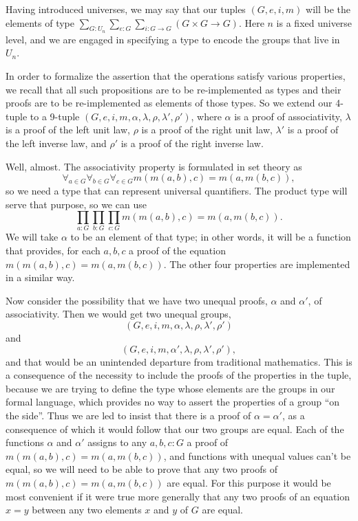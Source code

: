 \documentclass[letter,12pt]{amsart}
\theoremstyle{definition}
\theoremstyle{remark}
\numberwithin{equation}{section}
\begin{document}
Having introduced universes, we may say that our tuples $(G,e,i,m)$ will be the elements of type $\sum _ {G : U_n} \sum _ {e:G} \sum _ {i:G
  \to G} ( G \times G \to G )$.  Here $n$ is a fixed universe level, and we are engaged in specifying a type to encode the groups that live in
$U_n$.

In order to formalize the assertion that the operations satisfy various properties, we recall that all such propositions are to be
re-implemented as types and their proofs are to be re-implemented as elements of those types.  So we extend our 4-tuple to a 9-tuple
$(G,e,i,m,\alpha,\lambda,\rho,\lambda',\rho')$, where $\alpha$ is a proof of associativity, $\lambda$ is a proof of the left unit law, $\rho$ is
a proof of the right unit law, $\lambda'$ is a proof of the left inverse law, and $\rho'$ is a proof of the right inverse law.

Well, almost.  The associativity property is formulated in set theory as
$$\forall _ {a \in G}\forall _ {b \in G}\forall _ {c \in G} m (m (a,b), c) = m(a, m(b,c)),$$ so we need a type that can represent universal quantifiers.
The product type will serve that purpose, so we can use
 $$\prod _ {a: G}\prod _ {b: G}\prod _ {c: G} m (m (a,b), c) = m(a, m(b,c)).$$ We will take $\alpha$ to be an element of that type; in other
words, it will be a function that provides, for each $a,b,c$ a proof of the equation $m (m (a,b), c) = m(a, m(b,c))$.  The other four properties
are implemented in a similar way.

Now consider the possibility that we have two unequal proofs, $\alpha$ and $\alpha'$, of associativity.  Then we would get two unequal groups,
$$(G,e,i,m,\alpha,\lambda,\rho,\lambda',\rho')$$ and $$(G,e,i,m,\alpha',\lambda,\rho,\lambda',\rho'),$$ and that would be an unintended departure from
traditional mathematics.  This is a consequence of the necessity to include the proofs of the properties in the tuple, because we are trying to
define the type whose elements are the groups in our formal language, which provides no way to assert the properties of a group ``on the side''.
Thus we are led to insist that there is a proof of $\alpha = \alpha'$, as a consequence of which it would follow that our two groups are equal.
Each of the functions $\alpha$ and $\alpha'$ assigns to any $a,b,c:G$ a proof of $m (m (a,b), c) = m(a, m(b,c))$, and functions with unequal
values can't be equal, so we will need to be able to prove that any two proofs of $m (m (a,b), c) = m(a, m(b,c))$ are equal.  For this purpose
it would be most convenient if it were true more generally that any two proofs of an equation $x=y$ between any two elements $x$ and $y$ of $G$ are
equal.
\end{document}
